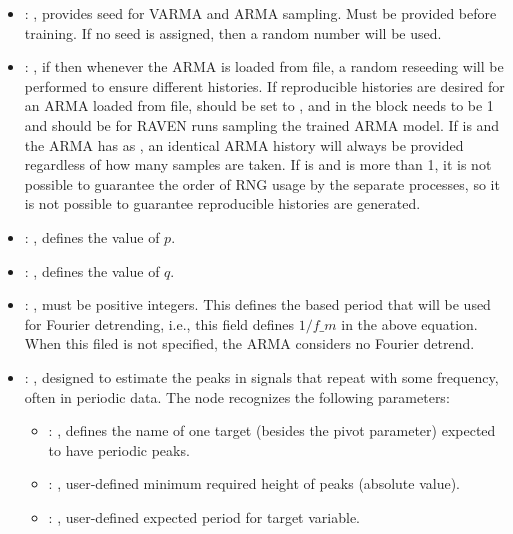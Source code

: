\begin{itemize}
    \item {}: ,
      provides seed for VARMA and ARMA sampling.
      Must be provided before training. If no seed is assigned,
      then a random number will be used.

    \item {}: ,
      if  then whenever the ARMA is loaded from file, a
      random reseeding will be performed to ensure different histories. \nb If
      reproducible histories are desired for an ARMA loaded from file,
       should be set to , and in the
       block  needs to be 1
      and  should be
       for RAVEN runs sampling the trained ARMA model.
      If  is  and the ARMA has
       as , an identical ARMA history
      will always be provided regardless of how many samples are taken.
      If  is  and 
      is more than 1, it is not possible to guarantee the order of RNG usage by
      the separate processes, so it is not possible to guarantee reproducible
      histories are generated.

    \item {}: ,
      defines the value of $p$.

    \item {}: ,
      defines the value of $q$.

    \item {}: ,
      must be positive integers. This defines the
      based period that will be used for Fourier detrending, i.e., this
      field defines $1/f\_m$ in the above equation.
      When this filed is not specified, the ARMA considers no Fourier detrend.

    \item {}: ,
      designed to estimate the peaks in signals that repeat with some frequency,
      often in periodic data.
      The  node recognizes the following parameters:
        \begin{itemize}
          \item {}: ,
            defines the name of one target (besides the                         pivot parameter)
            expected to have periodic peaks.
          \item {}: ,
            user-defined minimum required                         height of peaks (absolute value).
          \item {}: ,
            user-defined expected period for target variable.
      \end{itemize}


\end{itemize}
